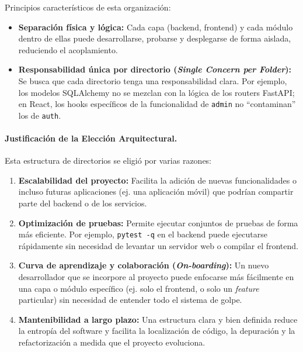 Principios característicos de esta organización:
\begin{itemize}[leftmargin=*]
  \item \textbf{Separación física y lógica:} Cada capa (backend, frontend) y cada módulo dentro de ellas puede desarrollarse, probarse y desplegarse de forma aislada, reduciendo el acoplamiento.
  \item \textbf{Responsabilidad única por directorio (\emph{Single Concern per Folder}):} Se busca que cada directorio tenga una responsabilidad clara. Por ejemplo, los modelos SQLAlchemy no se mezclan con la lógica de los routers FastAPI; en React, los hooks específicos de la funcionalidad de \texttt{admin} no ``contaminan'' los de \texttt{auth}.
\end{itemize}

\paragraph{Justificación de la Elección Arquitectural.}
Esta estructura de directorios se eligió por varias razones:
\begin{enumerate}[leftmargin=*]
  \item \textbf{Escalabilidad del proyecto:} Facilita la adición de nuevas funcionalidades o incluso futuras aplicaciones (ej. una aplicación móvil) que podrían compartir parte del backend o de los servicios.
  \item \textbf{Optimización de pruebas:} Permite ejecutar conjuntos de pruebas de forma más eficiente. Por ejemplo, \texttt{pytest -q} en el backend puede ejecutarse rápidamente sin necesidad de levantar un servidor web o compilar el frontend.
  \item \textbf{Curva de aprendizaje y colaboración (\emph{On-boarding}):} Un nuevo desarrollador que se incorpore al proyecto puede enfocarse más fácilmente en una capa o módulo específico (ej. solo el frontend, o solo un \emph{feature} particular) sin necesidad de entender todo el sistema de golpe.
  \item \textbf{Mantenibilidad a largo plazo:} Una estructura clara y bien definida reduce la entropía del software y facilita la localización de código, la depuración y la refactorización a medida que el proyecto evoluciona.
\end{enumerate}

